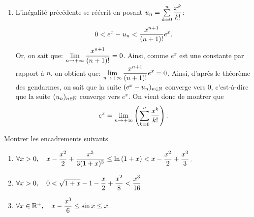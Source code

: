 \documentclass[a4paper, 11pt,reqno]{article}
\begin{document}
\begin{correction}
\begin{enumerate}
		\item L'in\'egalit\'e pr\'ec\'edente se r\'e\'ecrit en posant $u_n=\sum\limits_{k=0}^n \displaystyle\frac{x^k}{k!}$:
		      $$0 <  e^x-u_n < \displaystyle\frac{x^{n+1}}{(n+1)!}e^x.$$
		      Or, on sait que: $\lim\limits_{n\to +\infty} \displaystyle\frac{x^{n+1}}{(n+1)!}=0$. Ainsi, comme $e^x$ est une constante par rapport \`a $n$, on obtient que: $\lim\limits_{n\to +\infty} \displaystyle\frac{x^{n+1}}{(n+1)!}e^x=0$. Ainsi, d'apr\`es le th\'eor\`eme des gendarmes, on sait que la suite $(e^x-u_n)_{n\in\mathbb{N}}$ converge vers 0, c'est-\`a-dire que la suite $(u_n)_{n\in \mathbb{N}}$ converge vers $e^x$. On vient donc de montrer que
		      $$e^x=\lim\limits_{n\to +\infty}\left( \sum\limits_{k=0}^n \displaystyle\frac{x^k}{k!}  \right).$$
	\end{enumerate}
\end{correction}



\begin{exercice}
	Montrer les encadrements suivants
	\begin{enumerate}
		\item $\forall x>0,\quad x-\displaystyle\frac{x^2}{2} +\displaystyle\frac{x^3}{3(1+x)^3} \leq\ln{(1+x)}<x-\displaystyle\frac{x^2}{2}+\displaystyle\frac{x^3}{3}$.
		\item $\forall x>0,\quad 0<\sqrt{1+x}-1-\displaystyle\frac{x}{2}+\displaystyle\frac{x^2}{8}<\displaystyle\frac{x^3}{16}$
		\item $\forall x\in\mathbb{R}^+,\quad x-\displaystyle\frac{x^3}{6}\leq \sin{x}\leq x$.
	\end{enumerate}
\end{exercice}
\end{document}
